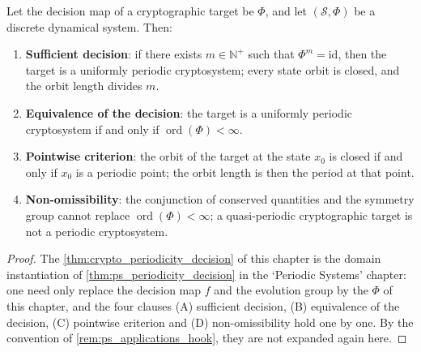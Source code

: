 \begin{theorem}\label{thm:crypto_periodicity_decision}
Let the decision map of a cryptographic target be \(\Phi\), and let \((\mathcal S,\Phi)\) be a discrete dynamical system. Then:
\begin{enumerate}[label=(\Alph*)]
    \item \textbf{Sufficient decision}: if there exists \(m\in\mathbb N^+\) such that \(\Phi^m=\mathrm{id}\), then the target is a uniformly periodic cryptosystem; every state orbit is closed, and the orbit length divides \(m\).
    \item \textbf{Equivalence of the decision}: the target is a uniformly periodic cryptosystem if and only if \(\operatorname{ord}(\Phi)<\infty\).
    \item \textbf{Pointwise criterion}: the orbit of the target at the state \(x_0\) is closed if and only if \(x_0\) is a periodic point; the orbit length is then the period at that point.
    \item \textbf{Non-omissibility}: the conjunction of conserved quantities and the symmetry group cannot replace \(\operatorname{ord}(\Phi)<\infty\); a quasi-periodic cryptographic target is not a periodic cryptosystem.
\end{enumerate}
\end{theorem}

\begin{proof}
The \cref{thm:crypto_periodicity_decision} of this chapter is the domain instantiation of \cref{thm:ps_periodicity_decision} in the `Periodic Systems' chapter:
one need only replace the decision map $f$ and the evolution group by the $\Phi$ of this chapter, and the four clauses (A) sufficient decision, (B) equivalence of the decision, (C) pointwise criterion and
(D) non-omissibility hold one by one. By the convention of \cref{rem:ps_applications_hook}, they are not expanded again here.
\end{proof}

